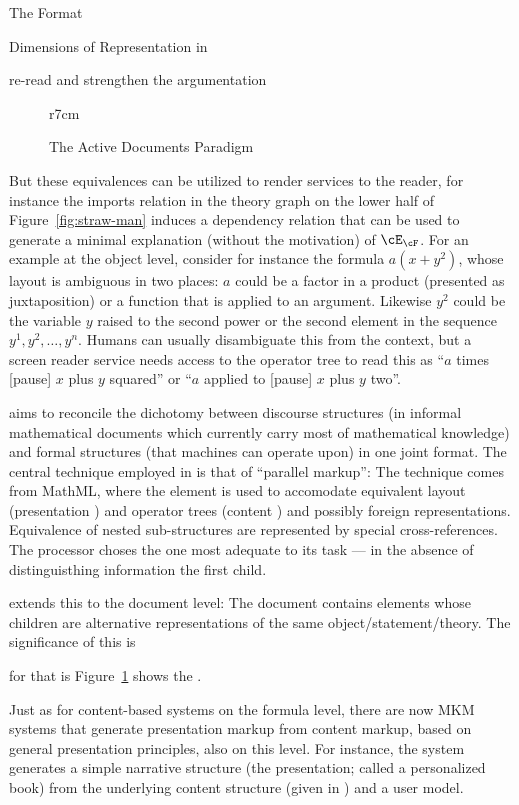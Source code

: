 \begin{omgroup}[creators=miko,id=spec-intro]{The {\omdoc} Format}
\begin{omgroup}[id=syntax-semantics]{Dimensions of Representation in {\omdoc}}
\begin{newpart}{re-read and strengthen the argumentation}
\begin{figure}r{7cm}\vspace*{-1em}
\caption{The Active Documents Paradigm}\label{fig:adp}\vspace*{-1em}
\end{figure}
But these equivalences can be utilized to render services to the reader, for instance the
imports relation in the theory graph on the lower half of Figure~\ref{fig:straw-man}
induces a dependency relation that can be used to generate a minimal explanation (without
the motivation) of $\cE_\cF$.  For an example at the object level, consider for instance
the formula $a(x+y^2)$, whose layout is ambiguous in two places: $a$ could be a factor in
a product (presented as juxtaposition) or a function that is applied to an
argument. Likewise $y^2$ could be the variable $y$ raised to the second power or the
second element in the sequence $y^1,y^2,\ldots,y^n$. Humans can usually disambiguate this
from the context, but a screen reader service needs access to the operator tree to read
this as ``$a$ times [pause] $x$ plus $y$ squared'' or ``$a$ applied to [pause] $x$ plus
$y$ two''.

\omdoc aims to reconcile the dichotomy between discourse structures (in informal
mathematical documents which currently carry most of mathematical knowledge) and formal
structures (that machines can operate upon) in one joint format. The central technique
employed in \omdoc is that of ``parallel markup'': The technique comes from MathML, where
the  element is used to accomodate equivalent layout (presentation
{\mathml}) and operator trees (content {\mathml}) and possibly foreign
representations. Equivalence of nested sub-structures are represented by special
cross-references.  The \mathml processor choses the one most adequate to its task --- in
the absence of distinguisthing information the first child.

\omdoc extends this to the document level: The document contains elements whose children
are alternative representations of the same object/statement/theory. The significance of this is

for that is Figure~\ref{fig:adp} shows the .


Just as for content-based systems on the formula level, there are now MKM systems that
generate presentation markup from content markup, based on general presentation
principles, also on this level. For instance, the {}
system~\cite{MelBue:krma03} generates a simple narrative structure (the
presentation; called a personalized book) from the underlying content structure (given in
{\omdoc}) and a user model.


\end{newpart}
\end{omgroup}
\end{omgroup}
